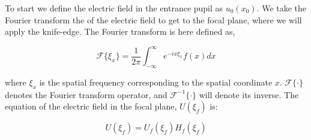  




To start we define the electric field in the entrance pupil as $u_0(x_0)$. We take the Fourier transform the of the electric field to get to the focal plane, where we will apply the knife-edge. The Fourier transform is here defined as,

\begin{equation}
    \mathcal{F}\{\xi_x\}=\frac{1}{2\pi}\int_{-\infty}^\infty e^{-i x \xi_x} f(x) dx
    \label{FourierT}
\end{equation}

where $\xi_x$ is the spatial frequency corresponding to the spatial coordinate $x$. $\mathcal{F}\{\cdot\}$ denotes the Fourier transform operator, and  $\mathcal{F}^{-1}\{\cdot\}$ will denote its inverse. The equation of the electric field in the focal plane, $U(\xi_f)$ is:

\begin{equation}
    U (\xi_f)=U_f(\xi_f)H_f(\xi_f)
    \label{FT}
\end{equation}

